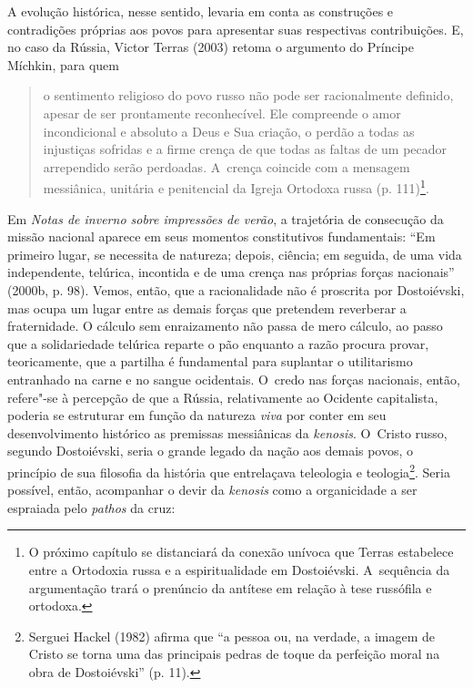 A evolução histórica, nesse sentido, levaria em conta as construções e
contradições próprias aos povos para apresentar suas respectivas
contribuições. E, no caso da Rússia, Victor Terras (2003) retoma o
argumento do Príncipe Míchkin, para quem

\begin{quote}
o sentimento religioso do povo russo não pode ser racionalmente
definido, apesar de ser prontamente reconhecível. Ele compreende o amor
incondicional e absoluto a Deus e Sua criação, o perdão a todas as
injustiças sofridas e a firme crença de que todas as faltas de um
pecador arrependido serão perdoadas. A~crença coincide com a mensagem
messiânica, unitária e penitencial da Igreja Ortodoxa russa (p.
111)\footnote{O próximo capítulo se distanciará da conexão unívoca que
  Terras estabelece entre a Ortodoxia russa e a espiritualidade em
  Dostoiévski. A~sequência da argumentação trará o prenúncio da antítese
  em relação à tese russófila e ortodoxa.}.
\end{quote}

Em \emph{Notas de inverno sobre impressões de verão}, a trajetória de
consecução da missão nacional aparece em seus momentos constitutivos
fundamentais: ``Em primeiro lugar, se necessita de natureza; depois,
ciência; em seguida, de uma vida independente, telúrica, incontida e de
uma crença nas próprias forças nacionais'' (2000b, p. 98). Vemos, então,
que a racionalidade não é proscrita por Dostoiévski, mas ocupa um lugar
entre as demais forças que pretendem reverberar a fraternidade. O
cálculo sem enraizamento não passa de mero cálculo, ao passo que a
solidariedade telúrica reparte o pão enquanto a razão procura provar,
teoricamente, que a partilha é fundamental para suplantar o utilitarismo
entranhado na carne e no sangue ocidentais. O~credo nas forças
nacionais, então, refere"-se à percepção de que a Rússia, relativamente
ao Ocidente capitalista, poderia se estruturar em função da natureza
\emph{viva} por conter em seu desenvolvimento histórico as premissas
messiânicas da \emph{kenosis}. O~Cristo russo, segundo Dostoiévski,
seria o grande legado da nação aos demais povos, o princípio de sua
filosofia da história que entrelaçava teleologia e teologia\footnote{Serguei
  Hackel (1982) afirma que ``a pessoa ou, na verdade, a imagem de Cristo
  se torna uma das principais pedras de toque da perfeição moral na obra
  de Dostoiévski'' (p. 11).}. Seria possível, então, acompanhar o devir
da \emph{kenosis} como a organicidade a ser espraiada pelo \emph{pathos}
da cruz:

